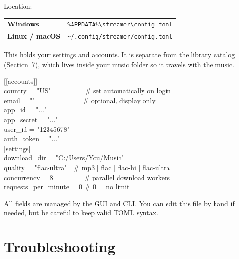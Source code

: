 \documentclass[11pt,a4paper]{article}
\begin{document}
Location:

\begin{center}
\begin{tabularx}{\linewidth}{@{}l X@{}}
\toprule
\textbf{Windows}    & \texttt{\%APPDATA\%\textbackslash{}streamer\textbackslash{}config.toml} \\
\textbf{Linux / macOS} & \texttt{\textasciitilde/.config/streamer/config.toml} \\
\bottomrule
\end{tabularx}
\end{center}

This holds your settings and accounts.  It is separate from the library
catalog (Section~7), which lives inside your music folder so it travels with
the music.

\begin{cmdbox}
{[[}accounts{]]}\\
country = "US"~~~~~~~~~~\# set automatically on login\\
email = ""~~~~~~~~~~~~~~\# optional, display only\\
app\_id = "..."\\
app\_secret = "..."\\
user\_id = "12345678"\\
auth\_token = "..."\\[6pt]
{[}settings{]}\\
download\_dir = "C:/Users/You/Music"\\
quality = "flac-ultra"~~\# mp3 | flac | flac-hi | flac-ultra\\
concurrency = 8~~~~~~~~~\# parallel download workers\\
requests\_per\_minute = 0 \# 0 = no limit
\end{cmdbox}

All fields are managed by the GUI and CLI.  You can edit this file by hand if
needed, but be careful to keep valid TOML syntax.

\section{Troubleshooting}
\end{document}
